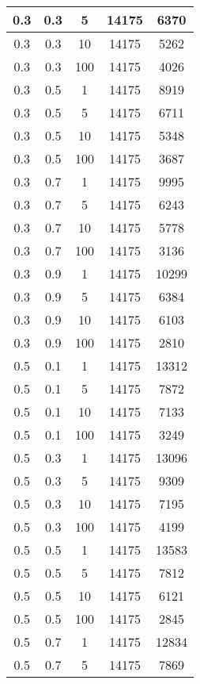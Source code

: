 \begin{appendices}
\begin{longtable}{|c|c|c|c|c|}
		0.3   & 0.3    & 5    & 14175 & 6370  \\ \hline
		0.3   & 0.3    & 10   & 14175 & 5262  \\ \hline
		0.3   & 0.3    & 100  & 14175 & 4026  \\ \hline
		0.3   & 0.5    & 1    & 14175 & 8919  \\ \hline
		0.3   & 0.5    & 5    & 14175 & 6711  \\ \hline
		0.3   & 0.5    & 10   & 14175 & 5348  \\ \hline
		0.3   & 0.5    & 100  & 14175 & 3687  \\ \hline
		0.3   & 0.7    & 1    & 14175 & 9995  \\ \hline
		0.3   & 0.7    & 5    & 14175 & 6243  \\ \hline
		0.3   & 0.7    & 10   & 14175 & 5778  \\ \hline
		0.3   & 0.7    & 100  & 14175 & 3136  \\ \hline
		0.3   & 0.9    & 1    & 14175 & 10299 \\ \hline
		0.3   & 0.9    & 5    & 14175 & 6384  \\ \hline
		0.3   & 0.9    & 10   & 14175 & 6103  \\ \hline
		0.3   & 0.9    & 100  & 14175 & 2810  \\ \hline
		0.5   & 0.1    & 1    & 14175 & 13312 \\ \hline
		0.5   & 0.1    & 5    & 14175 & 7872  \\ \hline
		0.5   & 0.1    & 10   & 14175 & 7133  \\ \hline
		0.5   & 0.1    & 100  & 14175 & 3249  \\ \hline
		0.5   & 0.3    & 1    & 14175 & 13096 \\ \hline
		0.5   & 0.3    & 5    & 14175 & 9309  \\ \hline
		0.5   & 0.3    & 10   & 14175 & 7195  \\ \hline
		0.5   & 0.3    & 100  & 14175 & 4199  \\ \hline
		0.5   & 0.5    & 1    & 14175 & 13583 \\ \hline
		0.5   & 0.5    & 5    & 14175 & 7812  \\ \hline
		0.5   & 0.5    & 10   & 14175 & 6121  \\ \hline
		0.5   & 0.5    & 100  & 14175 & 2845  \\ \hline
		0.5   & 0.7    & 1    & 14175 & 12834 \\ \hline
		0.5   & 0.7    & 5    & 14175 & 7869  \\ \hline

\end{longtable}
\end{appendices}
